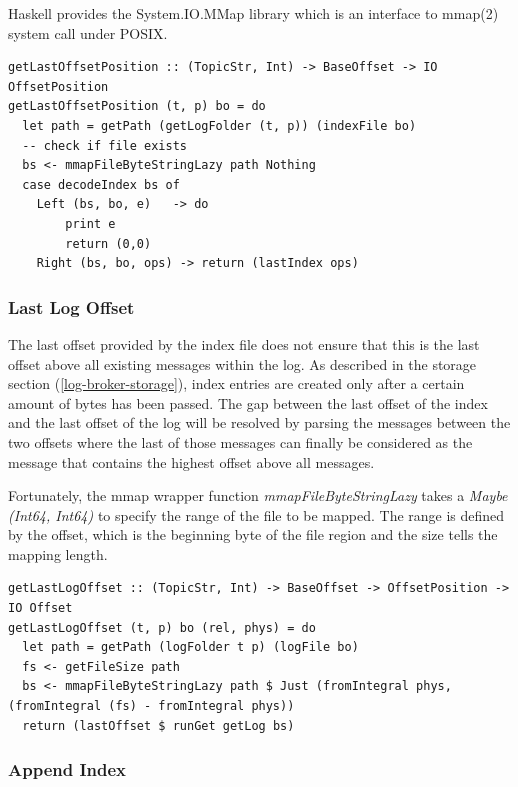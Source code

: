 Haskell provides the System.IO.MMap library which is an interface to mmap(2)
system call under POSIX. 


\begin{lstlisting}
getLastOffsetPosition :: (TopicStr, Int) -> BaseOffset -> IO OffsetPosition
getLastOffsetPosition (t, p) bo = do 
  let path = getPath (getLogFolder (t, p)) (indexFile bo)
  -- check if file exists
  bs <- mmapFileByteStringLazy path Nothing
  case decodeIndex bs of
    Left (bs, bo, e)   -> do
        print e
        return (0,0)
    Right (bs, bo, ops) -> return (lastIndex ops)
\end{lstlisting}


\subsubsection{Last Log Offset}

The last offset provided by the index file does not ensure that this is the
last offset above all existing messages within the log. As described in the
storage section (\ref{log-broker-storage}), index entries are created only after a
certain amount of bytes has been passed. The gap between the last offset of the
index and the last offset of the log will be resolved by parsing the messages
between the two offsets where the last of those messages can finally be
considered as the message that contains the highest offset above all messages. 

Fortunately, the mmap wrapper function \textit{mmapFileByteStringLazy} takes a
\textit{Maybe (Int64, Int64)} to specify the range of the file to be mapped.
The range is defined by the offset, which is the beginning byte of the file
region and the size tells the mapping length.

\begin{lstlisting}
getLastLogOffset :: (TopicStr, Int) -> BaseOffset -> OffsetPosition -> IO Offset
getLastLogOffset (t, p) bo (rel, phys) = do
  let path = getPath (logFolder t p) (logFile bo)
  fs <- getFileSize path
  bs <- mmapFileByteStringLazy path $ Just (fromIntegral phys, (fromIntegral (fs) - fromIntegral phys))
  return (lastOffset $ runGet getLog bs)
\end{lstlisting}

\subsubsection{Append Index}

